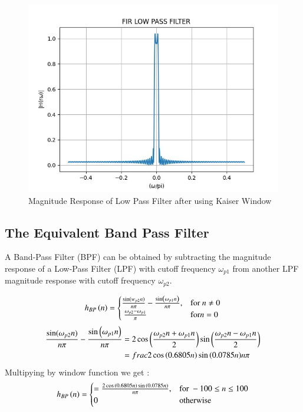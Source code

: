 \documentclass{article}
\begin{document}
\begin{figure}[H]
    \centering
    \includegraphics[width=1\columnwidth]{figs/FIR_Low_Filter.png}
    \caption{Magnitude Response of Low Pass Filter after using Kaiser Window}
    \label{fig:Kaiser_LPF_response}
\end{figure}

\subsection{The Equivalent Band Pass Filter}
A Band-Pass Filter (BPF) can be obtained by subtracting the magnitude response of a Low-Pass Filter (LPF) with cutoff frequency $\omega_{p1}$ from another LPF magnitude response with cutoff frequency $\omega_{p2}$.

\begin{align}
    h_{BP}\left(n\right) = 
    \begin{cases} 
        \frac{\sin(w_{p2} n)}{n\pi} -\frac{\sin\left(\omega_{p1}n\right)}{n\pi}, & \text{for } n\neq 0 \\\
        \frac{\omega_{p2}-\omega_{p1}}{\pi}                                & \text{for} n= 0
    \end{cases} \label{eq:h(n)desired_for_LPF}
\end{align}
\begin{align}
    \frac{\sin(\omega_{p2} n)}{n\pi} -\frac{\sin\left(\omega_{p1}n\right)}{n\pi} & = 2\cos{\ensuremath{\left(\frac{\omega_{p2}n+\omega_{p1}n}{2}\right)}}\sin{\ensuremath{\left(\frac{\omega_{p2}n-\omega_{p1}n}{2}\right)}} \\     & = frac{2\cos{\ensuremath{\left(0.6805n\right)}}\sin{\ensuremath{\left(0.0785n\right)}}}{n\pi}
\end{align}
Multipying by window function we get :
\begin{align}
    h_{BP}\left(n\right) = 
    \begin{cases} 
        = \frac{2\cos{\ensuremath{\left(0.6805n\right)}}\sin{\ensuremath{\left(0.0785n\right)}}}{n\pi}, & \text{for } -100\leq n \leq 100 \\
 0  & \text{otherwise}
    \end{cases} \label{eq:h(n)desired_for_LPF}
\end{align}
\end{document}
